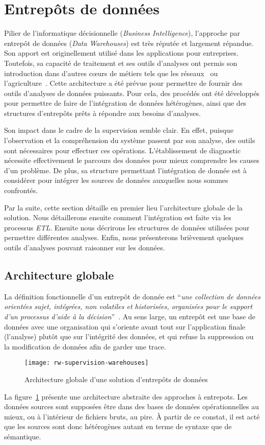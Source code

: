 \section{Entrepôts de données}\label{sec:rw:supervision:warehouse}
Pilier de l'informatique décisionnelle (\textit{Business Intelligence}), l'approche par entrepôt de données (\textit{Data Warehouses}) est très réputée et largement répandue. Son apport est originellement utilisé dans les applications pour entreprises. Toutefois, sa capacité de traitement et ses outils d'analyses ont permis son introduction dans d'autres cœurs de métiers tels que les réseaux~\cite{Gilbert:quicksand} ou l'agriculture~\cite{Abdullah:olap}. Cette architecture a été prévue pour permettre de fournir des outils d'analyses de données puissants. Pour cela, des procédés ont été développés pour permettre de faire de l'intégration de données hétérogènes, ainsi que des structures d'entrepôts prêts à répondre aux besoins d'analyses.

Son impact dans le cadre de la supervision semble clair. En effet, puisque l'observation et la compréhension du système passent par son analyse, des outils sont nécessaires pour effectuer ces opérations. L'établissement de diagnostic nécessite effectivement le parcours des données pour mieux comprendre les causes d'un problème. De plus, sa structure permettant l'intégration de donnée est à considérer pour intégrer les sources de données auxquelles nous sommes confrontés.

Par la suite, cette section détaille en premier lieu l'architecture globale de la solution. Nous détaillerons ensuite comment l'intégration est faite via les processus \textit{ETL}. Ensuite nous décrirons les structures de données utilisées pour permettre différentes analyses. Enfin, nous présenterons brièvement quelques outils d'analyses pouvant raisonner sur les données.

\subsection{Architecture globale}
La définition fonctionnelle d'un entrepôt de donnée est \enquote{\it une collection de données orientées sujet, intégrées, non volatiles et historisées, organisées pour le support d’un processus d’aide à la décision}~\cite{Inmon:warehouse}. Au sens large, un entrepôt est une base de données avec une organisation qui s'oriente avant tout sur l'application finale (l'analyse) plutôt que sur l'intégrité des données, et qui refuse la suppression ou la modification de données afin de garder une trace.
\begin{figure}[ht]
	\centering
	\texttt{[image: rw-supervision-warehouses]}
	\caption{Architecture globale d'une solution d'entrepôts de données}\label{fig:rw:supervision:warehouses}
\end{figure}
La figure~\ref{fig:rw:supervision:warehouses} présente une architecture abstraite des approches à entrepots. Les données sources sont supposées être dans des bases de données opérationnelles au mieux, ou à l'intérieur de fichiers bruts, au pire. À partir de ce constat, il est acté que les sources sont donc hétérogènes autant en terme de syntaxe que de sémantique.

